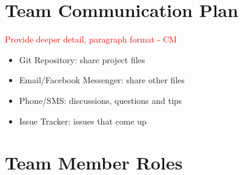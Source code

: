 \documentclass{article}
\begin{document}
\section{Team Communication Plan}
\textcolor{red}{Provide deeper detail, paragraph format - CM} \\
\begin{itemize}
\item Git Repository: share project files
\item Email/Facebook Messenger: share other files
\item Phone/SMS: discussions, questions and tips
\item Issue Tracker: issues that come up
\end{itemize}
\section{Team Member Roles}
\end{document}
